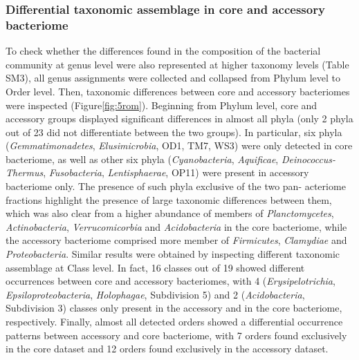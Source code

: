\subsubsection{Differential taxonomic assemblage in core and accessory bacteriome}
To check whether the differences found in the composition of the bacterial community at genus level were also represented at higher taxonomy levels (Table SM3), all genus assignments were collected and collapsed from Phylum level to Order level. Then, taxonomic differences between core and accessory bacteriomes were inspected (Figure\ref{fig:5rom}). Beginning from Phylum level, core and accessory groups displayed significant differences in almost all phyla (only 2 phyla out of 23 did not differentiate between the two groups). In particular, six phyla (\textit{Gemmatimonadetes}, \textit{Elusimicrobia}, OD1, TM7, WS3) were only detected in core bacteriome, as well as other six phyla (\textit{Cyano\-bacteria}, \textit{Aquificae}, \textit{Deino\-coc\-cus\--Ther\-mus}, \textit{Fuso\-bacte\-ria}, \textit{Lenti\-sphaerae}, OP11) were present in accessory bacteriome only. The presence of such phyla exclusive of the two pan- acteriome fractions highlight the presence of large taxonomic differences between them, which was also clear from a higher abundance of members of \textit{Plancto\-mycetes}, \textit{Actino\-bacteria}, \textit{Verruco\-micorbia} and \textit{Acido\-bacteria} in the core bacteriome, while the accessory bacteriome comprised more member of \textit{Firmicu\-tes}, \textit{Clamy\-diae} and \textit{Proteo\-bacteria}. Similar results were obtained by inspecting different taxonomic assemblage at Class level. In fact, 16 classes out of 19 showed different occurrences between core and accessory bacteriomes, with 4 (\textit{Erysi\-pelotri\-chia}, \textit{Epsilo\-proteo\-bacteria}, \textit{Holo\-phagae}, Subdivision 5) and 2 (\textit{Acido\-bacteria}, Subdivision 3) classes only present in the accessory and in the core bacteriome, respectively. Finally, almost all detected orders showed a differential occurrence patterns between accessory and core bacteriome, with 7 orders found exclusively in the core dataset and 12 orders found exclusively in the accessory dataset.\\
